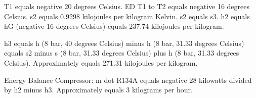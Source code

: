 T1 equals negative 20 degrees Celsius.  
ED T1 to T2 equals negative 16 degrees Celsius.  
s2 equals 0.9298 kilojoules per kilogram Kelvin.  
s2 equals s3.  
h2 equals hG (negative 16 degrees Celsius) equals 237.74 kilojoules per kilogram.  

h3 equals h (8 bar, 40 degrees Celsius) minus h (8 bar, 31.33 degrees Celsius)  
equals s2 minus s (8 bar, 31.33 degrees Celsius) plus h (8 bar, 31.33 degrees Celsius).  
Approximately equals 271.31 kilojoules per kilogram.  

Energy Balance Compressor:  
m dot R134A equals negative 28 kilowatts divided by h2 minus h3.  
Approximately equals 3 kilograms per hour.
